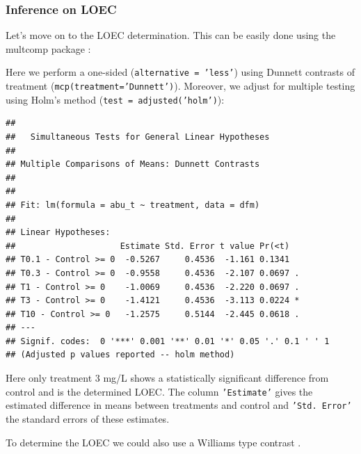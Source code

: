 \subsubsection{Inference on LOEC}
Let's move on to the LOEC determination.
This can be easily done using the multcomp package \citep{hothorn_simultaneous_2008}:

Here we perform a one-sided (\texttt{alternative = 'less'}) using Dunnett contrasts of treatment (\texttt{mcp(treatment='Dunnett')}).
Moreover, we adjust for multiple testing using Holm's method (\texttt{test = adjusted('holm')}):
\begin{knitrout}
\color{fgcolor}\begin{kframe}
\begin{alltt}
\hlstd{(}  \hlstd{=} \hlstd{(} \hlstd{=} \hlstd{),}   \hlstd{=} \hlstd{),}
         \hlstd{=} \hlstd{(}\hlstd{))}
\end{alltt}
\begin{verbatim}
## 
## 	 Simultaneous Tests for General Linear Hypotheses
## 
## Multiple Comparisons of Means: Dunnett Contrasts
## 
## 
## Fit: lm(formula = abu_t ~ treatment, data = dfm)
## 
## Linear Hypotheses:
##                     Estimate Std. Error t value Pr(<t)  
## T0.1 - Control >= 0  -0.5267     0.4536  -1.161 0.1341  
## T0.3 - Control >= 0  -0.9558     0.4536  -2.107 0.0697 .
## T1 - Control >= 0    -1.0069     0.4536  -2.220 0.0697 .
## T3 - Control >= 0    -1.4121     0.4536  -3.113 0.0224 *
## T10 - Control >= 0   -1.2575     0.5144  -2.445 0.0618 .
## ---
## Signif. codes:  0 '***' 0.001 '**' 0.01 '*' 0.05 '.' 0.1 ' ' 1
## (Adjusted p values reported -- holm method)
\end{verbatim}
\end{kframe}
\end{knitrout}

Here only treatment 3 mg/L shows a statistically significant difference from control and is the determined LOEC.
The column \texttt{'Estimate'} gives the estimated difference in means between treatments and control and \texttt{'Std. Error'} the standard errors of these estimates.


To determine the LOEC we could also use a Williams type contrast  \citep{bretz_multiple_2010}. 

